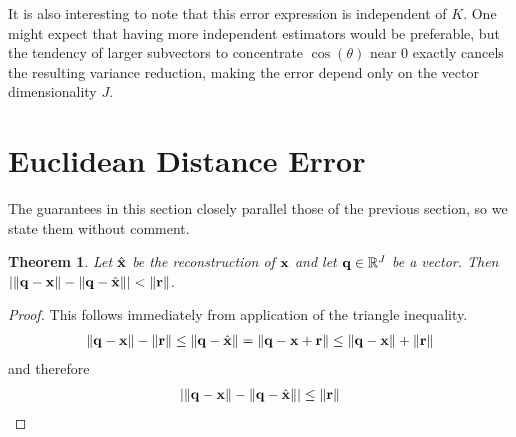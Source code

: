 \documentclass[]{article}
\newtheorem{theorem}{Theorem}[section]
\begin{document}
It is also interesting to note that this error expression is independent of $K$. One might expect that having more independent estimators would be preferable, but the tendency of larger subvectors to concentrate $\cos(\theta)$ near $0$ exactly cancels the resulting variance reduction, making the error depend only on the vector dimensionality $J$. %

\section{Euclidean Distance Error}

The guarantees in this section closely parallel those of the previous section, so we state them without comment.

\begin{theorem}
Let $\hat{\mathbf{x}}$ be the reconstruction of $\mathbf{x}$ and let $\mathbf{q} \in \mathbb{R}^J$ be a vector. Then $\lvert\lVert\mathbf{q} - \mathbf{x}\rVert - \lVert\mathbf{q} - \hat{\mathbf{x}}\rVert \rvert < \lVert\mathbf{r}\rVert$.
\end{theorem}

\begin{proof}
This follows immediately from application of the triangle inequality. %
\begin{align}
   \lVert\mathbf{q} - \mathbf{x}\rVert - \lVert\mathbf{r}\rVert \le \lVert\mathbf{q} - \hat{\mathbf{x}}\rVert = \lVert\mathbf{q} - \mathbf{x} + \mathbf{r}\rVert \le \lVert\mathbf{q} - \mathbf{x}\rVert + \lVert\mathbf{r}\rVert
\end{align}
and therefore
\begin{align}
    \lvert\lVert\mathbf{q} - \mathbf{x}\rVert - \lVert\mathbf{q} - \hat{\mathbf{x}}\rVert \rvert \le \lVert\mathbf{r}\rVert
\end{align}
\end{proof}




\end{document}
